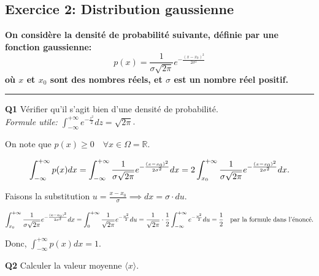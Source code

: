 \documentclass[french]{article}
\begin{document}
	\subsection*{Exercice 2: Distribution gaussienne}
	\textbf{On considère la densité de probabilité suivante, définie par une fonction gaussienne:
		\begin{equation}
			p(x) = \frac{1}{\sigma \sqrt{2\pi}}e^{-\frac{(x-x_0)^2}{2\sigma^2}}
		\end{equation}
		où $x$ et $x_0$ sont des nombres réels, et $\sigma$ est un nombre réel positif.
	}
	\vspace{.3cm}
	\hrule
	\vspace{.3cm}
	{%
		\begin{tcolorbox}[colback=gray!5!white,colframe=gray!75!black]
			\textbf{\large{Q1}} Vérifier qu'il s'agit bien d'une densité de probabilité.\\
			\textit{Formule utile: $\int_{-\infty}^{+\infty} e^{-\frac{z^2}{2}} dz = \sqrt{2\pi}$}.
		\end{tcolorbox}
	
		On note que $p(x) \geq 0 \quad \forall x \in \Omega = \mathbb{R}$.
		
		\begin{dmath}
			\int_{-\infty}^{+\infty} p(x) dx = \int_{-\infty}^{+\infty} \frac{1}{\sigma \sqrt{2\pi}}e^{-\frac{(x-x_0)^2}{2\sigma^2}} dx \\
			= 2 \int_{x_0}^{+\infty} \frac{1}{\sigma \sqrt{2\pi}}e^{-\frac{(x-x_0)^2}{2\sigma^2}} dx.
		\end{dmath}
	
		Faisons la substitution $u = \frac{x - x_0}{\sigma} \implies dx = \sigma \cdot du$.
		
		\begin{dmath}
			\int_{x_0}^{+\infty} \frac{1}{\sigma \sqrt{2\pi}}e^{-\frac{(x-x_0)^2}{2\sigma^2}} dx =  \int_{0}^{+\infty} \frac{1}{\sqrt{2\pi}}e^{-\frac{u^2}{2}} du \\
			=  \frac{1}{\sqrt{2\pi}} \cdot \frac{1}{2} \int_{-\infty}^{+\infty} e^{-\frac{u^2}{2}} du
			=  \frac{1}{2}\quad \text{par la formule dans l'énoncé.}
		\end{dmath}
	
		Donc, $\int_{-\infty}^{+\infty} p(x) dx = 1$.
		
		\begin{tcolorbox}[colback=gray!5!white,colframe=gray!75!black]
			\textbf{\large{Q2}} Calculer la valeur moyenne $\langle x \rangle$.
		\end{tcolorbox}
	
}
\end{document}
